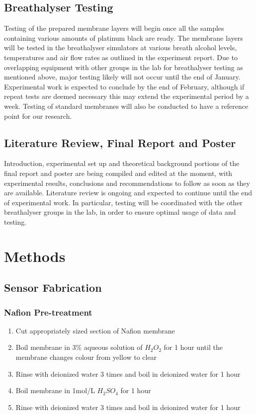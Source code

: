 \documentclass{article}
\begin{document}
		\subsection{Breathalyser Testing}
			Testing of the prepared membrane layers will begin once all the samples containing various amounts of platinum black are ready. The membrane layers will be tested in the breathalyser simulators at various breath alcohol levels, temperatures and air flow rates as outlined in the experiment report. Due to overlapping equipment with other groups in the lab for breathalyser testing as mentioned above, major testing likely will not occur until the end of January.
			Experimental work is expected to conclude by the end of February, although if repeat tests are deemed necessary this may extend the experimental period by a week. Testing of standard membranes will also be conducted to have a reference point for our research.

		\subsection{Literature Review, Final Report and Poster}
			Introduction, experimental set up and theoretical background portions of the final report and poster are being compiled and edited at the moment, with experimental results, conclusions and recommendations to follow as soon as they are available. Literature review is ongoing and expected to continue until the end of experimental work. In particular, testing will be coordinated with the other breathalyser groups in the lab, in order to ensure optimal usage of data and testing.
	\section{Methods}
		\subsection{Sensor Fabrication}
		\subsubsection{Nafion Pre-treatment}
			\begin{enumerate}
			\item Cut appropriately sized section of Nafion membrane
			\item Boil membrane in 3\% aqueous solution of $H_{2}O_{2}$ for 1 hour until the membrane changes colour from yellow to clear
			\item Rinse with deionized water 3 times and boil in deionized water for 1 hour
			\item Boil membrane in 1mol/L $H_{2}SO_{4}$ for 1 hour
			\item Rinse with deionized water 3 times and boil in deionized water for 1 hour
			\end{enumerate}
\end{document}
